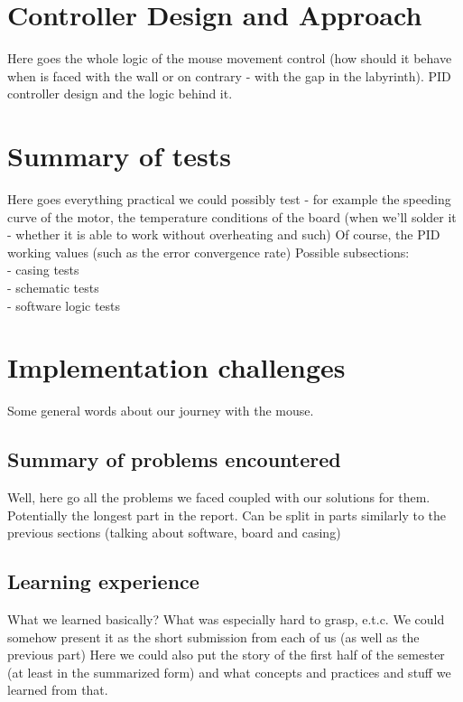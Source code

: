\documentclass[12pt]{article}
\begin{document}
\section{Controller Design and Approach}

Here goes the whole logic of the mouse movement control (how should it behave when is faced with the wall or on contrary - with the gap in the labyrinth). PID controller design and the logic behind it.

\section{Summary of tests}

Here goes everything practical we could possibly test - for example the speeding curve of the motor, the temperature conditions of the board (when we'll solder it - whether it is able to work without overheating and such) 
Of course, the PID working values (such as the error convergence rate)
Possible subsections:\\
    - casing tests \\
    - schematic tests \\
    - software logic tests \\

\section{Implementation challenges}
Some general words about our journey with the mouse.

\subsection{Summary of problems encountered}
Well, here go all the problems we faced coupled with our solutions for them. Potentially the longest part in the report. Can be split in parts similarly to the previous sections (talking about software, board and casing)

\subsection{Learning experience} %

What we learned basically? What was especially hard to grasp, e.t.c.
We could somehow present it as the short submission from each of us (as well as the previous part) Here we could also put the story of the first half of the semester (at least in the summarized form) and what concepts and practices and stuff we learned from that.
\end{document}
